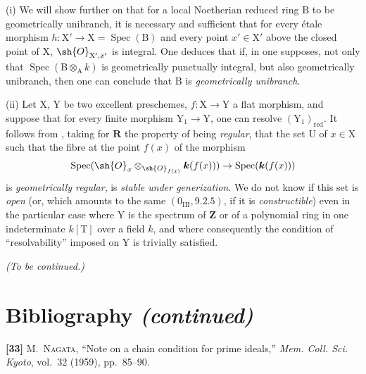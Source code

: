 \begin{remarks}[7.9.10]
\label{IV.7.9.10}
(i) We will show further on  that for a local Noetherian reduced ring $\mathrm{B}$ to be geometrically unibranch, it is necessary and sufficient that for every étale morphism $h:\mathrm{X}'\to\mathrm{X}=\operatorname{Spec}(\mathrm{B})$ and every point $x'\in\mathrm{X}'$ above the closed point of $\mathrm{X}$, $\sh{O}_{\mathrm{X}',x'}$ is integral. One deduces that if, in  one supposes, not only that $\operatorname{Spec}(\mathrm{B}\otimes_\mathrm{A} k)$ is geometrically punctually integral, but also geometrically unibranch, then one can conclude that $\mathrm{B}$ is \emph{geometrically unibranch}.


(ii) Let $\mathrm{X}$, $\mathrm{Y}$ be two excellent preschemes, $f:\mathrm{X}\to\mathrm{Y}$ a flat morphism, and suppose that for every finite morphism $\mathrm{Y}_1\to\mathrm{Y}$, one can resolve $(\mathrm{Y}_1)_{\mathrm{red}}$. It follows from , taking for $\boldsymbol{R}$ the property of being \emph{regular}, that the set $\mathrm{U}$ of $x\in\mathrm{X}$ such that the fibre at the point $f(x)$ of the morphism
\[
  \operatorname{Spec}(\sh{O}_x\otimes_{\sh{O}_{f(x)}}\boldsymbol{k}(f(x)))\to\operatorname{Spec}(\boldsymbol{k}(f(x)))
\]
is \emph{geometrically regular}, is \emph{stable under generization}. We do not know if this set is \emph{open} (or, which amounts to the same $(0_{\mathrm{III}}, 9.2.5)$, if it is \emph{constructible}) even in the particular case where $\mathrm{Y}$ is the spectrum of $\mathbf{Z}$ or of a polynomial ring in one indeterminate $k[\mathrm{T}]$ over a field $k$, and where consequently the condition of ``resolvability'' imposed on $\mathrm{Y}$ is trivially satisfied.
\end{remarks}

\begin{center}
\emph{(To be continued.)}
\end{center}

\clearpage
{}
{}
\section*{Bibliography \textnormal{\emph{(continued)}}}

\begingroup
\small
\setlength{\parindent}{0pt}
\setlength{\parskip}{4pt}

\textbf{[33]} M.~\textsc{Nagata}, ``Note on a chain condition for prime
ideals,'' \emph{Mem. Coll. Sci. Kyoto}, vol.~32 (1959), pp.~85--90.

